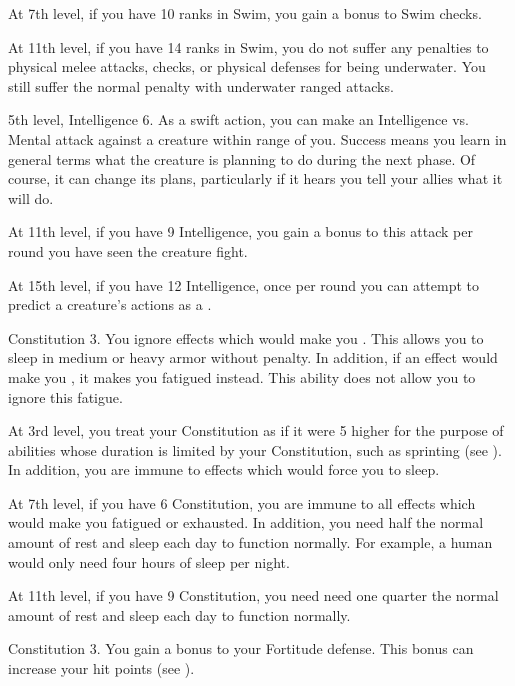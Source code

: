     At 7th level, if you have 10 ranks in Swim, you gain a  bonus to Swim checks.

    At 11th level, if you have 14 ranks in Swim, you do not suffer any penalties to physical melee attacks, checks, or physical defenses for being underwater.
    You still suffer the normal penalty with underwater ranged attacks.

    \featpres 5th level, Intelligence 6.
    \featben As a swift action, you can make an Intelligence vs. Mental attack against a creature within \rngmed range of you.
    Success means you learn in general terms what the creature is planning to do during the next phase.
    Of course, it can change its plans, particularly if it hears you tell your allies what it will do.

    At 11th level, if you have 9 Intelligence, you gain a  bonus to this attack per round you have seen the creature fight.

    At 15th level, if you have 12 Intelligence, once per round you can attempt to predict a creature's actions as a .

    \featpre Constitution 3.
    \featben You ignore effects which would make you \fatigued.
    This allows you to sleep in medium or heavy armor without penalty.
    In addition, if an effect would make you \exhausted, it makes you fatigued instead.
    This ability does not allow you to ignore this fatigue.

    At 3rd level, you treat your Constitution as if it were 5 higher for the purpose of abilities whose duration is limited by your Constitution, such as sprinting (see ).
    In addition, you are immune to effects which would force you to sleep.

    At 7th level, if you have 6 Constitution, you are immune to all effects which would make you fatigued or exhausted.
    In addition, you need half the normal amount of rest and sleep each day to function normally.
    For example, a human would only need four hours of sleep per night.

    At 11th level, if you have 9 Constitution, you need need one quarter the normal amount of rest and sleep each day to function normally.


    \featpre Constitution 3.
    \featben You gain a  bonus to your Fortitude defense.
    This bonus can increase your hit points (see ).


